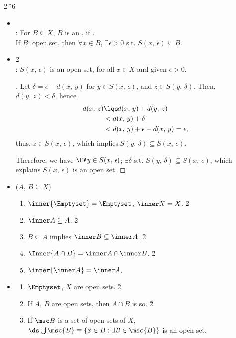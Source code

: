 \documentclass[dvipdfmx,a4paper,titlepage,9pt]{jsarticle}
\begin{document}
\begin{multicols*}{2}
\v{-6}
\begin{itemize}[label=-]
\item{} \\
: For $B\subseteq X$, $B$ is an , if . \\
\;\;If $B$: open set, then $\forall x\in B$, $\exists\epsilon>0$ s.t. $S(x,\,\epsilon)\subseteq B$. \\

\item{} \v2 \\
: $S(x,\,\epsilon)$ is an open set, for all $x\in X$ and given $\epsilon>0$.
\begin{pfbox}
\begin{proof}[]
Let $\delta=\epsilon-d(x,\,y)$ for $y\in S(x,\,\epsilon)$, and $z\in S(y,\,\delta)$.
Then, $d(y,\,z)<\delta$, hence
$$\begin{aligned}
  d(x,\,z)&\lqs d(x,\,y)+d(y,\,z) \\
          &<d(x,\,y)+\delta \\
          &<d(x,\,y)+\epsilon-d(x,\,y)=\epsilon,
  \end{aligned}$$
thus, $z\in S(x,\,\epsilon)$, which implies $S(y,\,\delta)\subseteq S(x,\,\epsilon)$.

Therefore, we have $\FA y\in S(x,\,\epsilon)$; $\exists\delta$ s.t. $S(y,\,\delta)\subseteq S(x,\,\epsilon)$, which explains $S(x,\,\epsilon)$ is an open set.
\end{proof}
\end{pfbox}

\;

\item{} {\Gray($A,\,B\subseteq X$)}
\begin{enumerate}[label=(\alph*)]
\item $\inner{\Emptyset}=\Emptyset$, $\inner X=X$. \v2
\item $\inner A\subseteq A$. \v2
\item $B\subseteq A$ implies $\inner B\subseteq\inner A$. \v2
\item $\Inner{A\cap B}=\inner A\cap\inner B$. \v2
\item $\inner{\inner A}=\inner A$. \\
\end{enumerate}

\item{}
\begin{enumerate}[label=(\alph*)]
\item $\Emptyset$, $X$ are open sets. \v2
\item If $A,\,B$ are open sets, then $A\cap B$ is so. \v2
\item If $\msc B$ is a set of open sets of $X$, \\
      $\ds\bigcup\msc{B}\equiv\{x\in B:\exists B\in\msc{B}\}$ is an open set.
\end{enumerate}


\end{itemize}
\end{multicols*}
\end{document}
